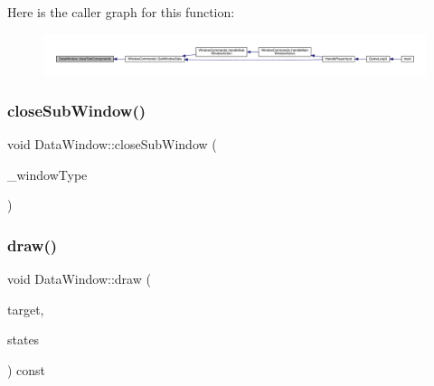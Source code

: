 Here is the caller graph for this function\+:
\nopagebreak
\begin{figure}[H]
\begin{center}
\leavevmode
\includegraphics[width=350pt]{d1/def/class_data_window_a2f7b8defc928dcf530149a82bdd16d53_icgraph}
\end{center}
\end{figure}
\mbox{\label{class_data_window_a1afcf0423ba1ad8b18792bb4ba73c314}} 
\subsubsection{\texorpdfstring{close\+Sub\+Window()}{closeSubWindow()}}
{\footnotesize\ttfamily void Data\+Window\+::close\+Sub\+Window (\begin{DoxyParamCaption}\item[{\mbox{\hyperlink{_data_window_8hpp_a3c1e0c6fe947fdbea7502497b27cf44d}{En\+Data\+Window\+Type}}}]{\+\_\+window\+Type }\end{DoxyParamCaption})}

\mbox{\label{class_data_window_a90b82a1d6d1831317002e3badc18c474}} 
\subsubsection{\texorpdfstring{draw()}{draw()}}
{\footnotesize\ttfamily void Data\+Window\+::draw (\begin{DoxyParamCaption}\item[{sf\+::\+Render\+Target \&}]{target,  }\item[{sf\+::\+Render\+States}]{states }\end{DoxyParamCaption}) const\hspace{0.3cm}{\ttfamily [virtual]}}

\mbox{\label{class_data_window_ab3ad6b28f3a4c54f692d623b4af48779}} 
